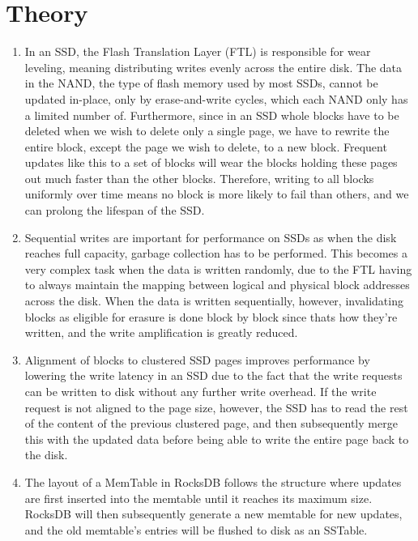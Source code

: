\section{Theory}

\begin{enumerate}
    \item 
        In an SSD, the Flash Translation Layer (FTL) is responsible for wear 
        leveling, meaning distributing writes evenly across the entire disk. The 
        data in the NAND, the type of flash memory used by most SSDs, cannot be 
        updated in-place, only by erase-and-write cycles, which each NAND only 
        has a limited number of. Furthermore, since in an SSD whole blocks have 
        to be deleted when we wish to delete only a single page, we have to 
        rewrite the entire block, except the page we wish to delete, to a new 
        block. Frequent updates like this to a set of blocks will wear the 
        blocks holding these pages out much faster than the other blocks. 
        Therefore, writing to all blocks uniformly over time means no block is 
        more likely to fail than others, and we can prolong the lifespan of the
        SSD.
    \item 
        Sequential writes are important for performance on SSDs as when the disk
        reaches full capacity, garbage collection has to be performed. This
        becomes a very complex task when the data is written randomly, due to 
        the FTL having to always maintain the mapping between logical and 
        physical block addresses across the disk. When the data is written 
        sequentially, however, invalidating blocks as eligible for erasure is 
        done block by block since thats how they're written, and the write 
        amplification is greatly reduced.
        
    \item 
        Alignment of blocks to clustered SSD pages improves performance by 
        lowering the write latency in an SSD due to the fact that the write 
        requests can be written to disk without any further write overhead. If 
        the write request is not aligned to the page size, however, the SSD has 
        to read the rest of the content of the previous clustered page, and then 
        subsequently merge this with the updated data before being able to write 
        the entire page back to the disk.
    \item 
        The layout of a MemTable in RocksDB follows the structure where updates
        are first inserted into the memtable until it reaches its maximum size.
        RocksDB will then subsequently generate a new memtable for new updates,
        and the old memtable's entries will be flushed to disk as an SSTable.


\end{enumerate}
